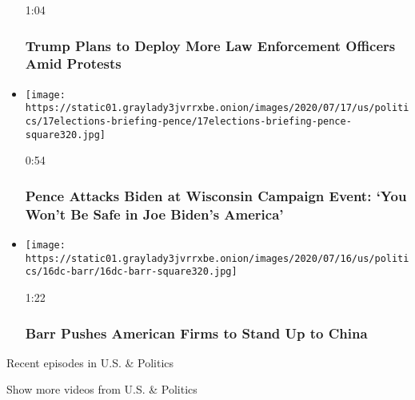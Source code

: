 \begin{itemize}
  1:04

  \hypertarget{trump-plans-to-deploy-more-law-enforcement-officers-amid-protests}{%
  \subsubsection{Trump Plans to Deploy More Law Enforcement Officers
  Amid
  Protests}\label{trump-plans-to-deploy-more-law-enforcement-officers-amid-protests}}
\item
  \href{https://www.nytimes3xbfgragh.onion/video/us/100000007244976/pence-calls-out-biden-wisconsin.html?action=click\&module=video-series-bar\&region=header\&pgtype=Article\&playlistId=video/us-politics}{}

  \texttt{[image: https://static01.graylady3jvrrxbe.onion/images/2020/07/17/us/politics/17elections-briefing-pence/17elections-briefing-pence-square320.jpg]}

  0:54

  \hypertarget{pence-attacks-biden-at-wisconsin-campaign-event-you-wont-be-safe-in-joe-bidens-america}{%
  \subsubsection{Pence Attacks Biden at Wisconsin Campaign Event: `You
  Won't Be Safe in Joe Biden's
  America'}\label{pence-attacks-biden-at-wisconsin-campaign-event-you-wont-be-safe-in-joe-bidens-america}}
\item
  \href{https://www.nytimes3xbfgragh.onion/video/us/elections/100000007242467/barr-china-companies-economy.html?action=click\&module=video-series-bar\&region=header\&pgtype=Article\&playlistId=video/us-politics}{}

  \texttt{[image: https://static01.graylady3jvrrxbe.onion/images/2020/07/16/us/politics/16dc-barr/16dc-barr-square320.jpg]}

  1:22

  \hypertarget{barr-pushes-american-firms-to-stand-up-to-china}{%
  \subsubsection{Barr Pushes American Firms to Stand Up to
  China}\label{barr-pushes-american-firms-to-stand-up-to-china}}
\end{itemize}

Recent episodes in U.S. \& Politics

Show more videos from U.S. \& Politics

\href{/video}{}

